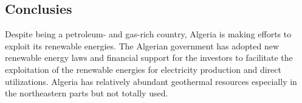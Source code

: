 \documentclass[a0,portrait]{a0poster}
\begin{document}
\begin{multicols}{3}

\color{SaddleBrown} %

\section*{Conclusies}
Despite being a petroleum- and gas-rich country, Algeria is making efforts to exploit its renewable energies. The Algerian government has adopted new renewable energy laws and financial support for the investors to facilitate the exploitation of the renewable energies for electricity production and direct utilizations. Algeria has relatively abundant geothermal resources especially in the northeastern parts but not totally used.
\color{Black} %






 
\end{multicols}
\end{document}
